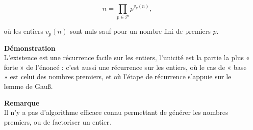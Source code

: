     \[
        n = \prod_{p \in \mathcal{P}}^{} p^{v_p(n)},
    \]
    
    où les entiers $v_p(n)$ sont nuls sauf pour un nombre fini de premiers $p$.
    
    \noindent\textbf{Démonstration}\\
    \indent L'existence est une récurrence facile sur les entiers, l'unicité est la partie
    la plus « forte » de l'énoncé : c'est aussi une récurrence sur les entiers,
    où le cas de « base » est celui des nombres premiers, et où l'étape de
    récurrence s'appuie sur le lemme de Gauß.
    
    \noindent\textbf{Remarque}\\
    \indent Il n'y a pas d'algorithme efficace connu permettant de générer les nombres
    premiers, ou de factoriser un entier.